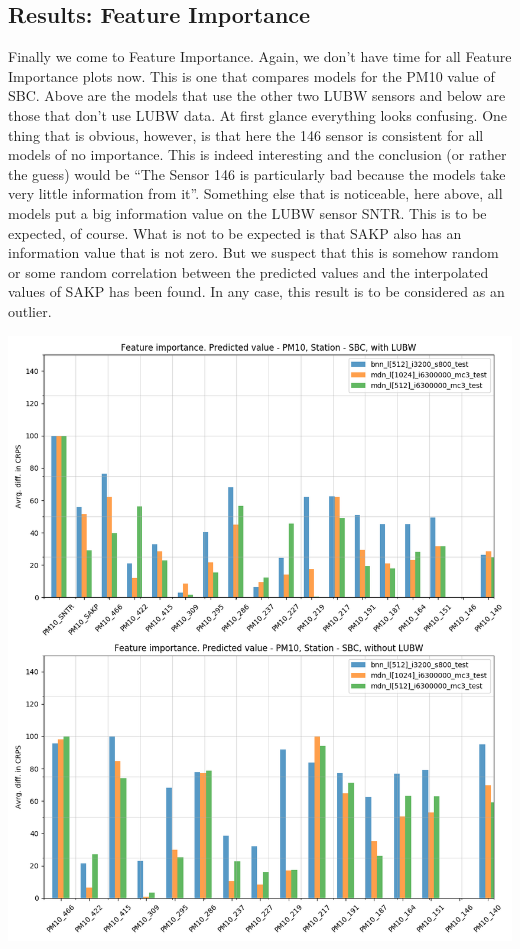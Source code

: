 \documentclass[margin=0.01in]{article}
\begin{document}
\subsection{Results: Feature Importance}
\label{sec:org3182a58}

Finally we come to Feature Importance. Again, we don't have time for all Feature Importance plots now. This is one that compares models for the PM10 value of SBC. Above are the models that use the other two LUBW sensors and below are those that don't use LUBW data. At first glance everything looks confusing. One thing that is obvious, however, is that here the 146 sensor is consistent for all models of no importance. This is indeed interesting and the conclusion (or rather the guess) would be ``The Sensor 146 is particularly bad because the models take very little information from it''. Something else that is noticeable, here above, all models put a big information value on the LUBW sensor SNTR. This is to be expected, of course. What is not to be expected is that SAKP also has an information value that is not zero. But we suspect that this is somehow random or some random correlation between the predicted values and the interpolated values of SAKP has been found. In any case, this result is to be considered as an outlier.

\begin{center}
\includegraphics[width=.9\linewidth]{../images/feature_importance_CRPS_SBC_P1.png}
\end{center}
\end{document}
